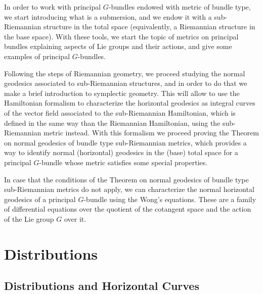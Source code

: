 \documentclass[12pt, letterpaper, reqno]{amsart}
\theoremstyle{definition}
\theoremstyle{plain}
\theoremstyle{remark}
\begin{document}
In order to work with principal $ G $-bundles endowed with metric of bundle type, we start introducing what is a submersion, and we endow it with a sub-Riemannian structure in the total space (equivalently, a Riemannian structure in the base space). With these tools, we start the topic of metrics on principal bundles explaining aspects of Lie groups and their actions, and give some examples of principal $ G $-bundles. 

Following the steps of Riemannian geometry, we proceed studying the normal geodesics associated to sub-Riemannian structures, and in order to do that we make a brief introduction to symplectic geometry. This will allow to use the Hamiltonian formalism to characterize the horizontal geodesics as integral curves of the vector field associated to the sub-Riemannian Hamiltonian, which is defined in the same way than the Riemannian Hamiltonian, using the sub-Riemannian metric instead. With this formalism we proceed proving the Theorem on normal geodesics of bundle type sub-Riemannian metrics, which provides a way to identify normal (horizontal) geodesics in the (base) total space for a principal $ G $-bundle whose metric satisfies some special properties.

In case that the conditions of the Theorem on normal geodesics of bundle type sub-Riemannian metrics do not apply, we can characterize the normal horizontal geodesics of a principal $ G $-bundle using the Wong's equations. These are a family of differential equations over the quotient of the cotangent space and the action of the Lie group $ G $ over it.
\section{Distributions}
\label{sec:1}

\subsection{Distributions and Horizontal Curves}%
\label{sub:distributions}
\end{document}

